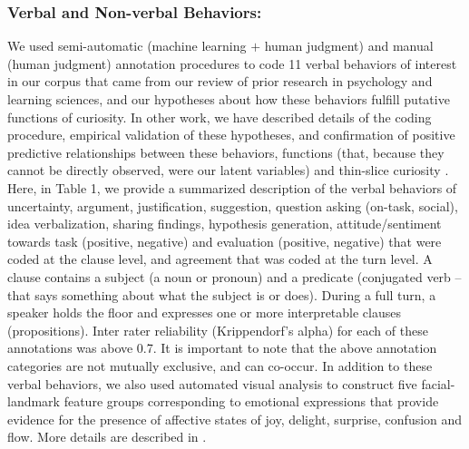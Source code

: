 \documentclass{llncs}
\begin{document}
\subsubsection{Verbal and Non-verbal Behaviors:}
\vspace{-0.35cm}
We used semi-automatic (machine learning $+$ human judgment) and manual (human judgment) annotation procedures to code 11 verbal behaviors of interest in our corpus that came from our review of prior research in psychology and learning sciences, and our hypotheses about how these behaviors fulfill putative functions of curiosity. In other work, we have described details of the coding procedure, empirical validation of these hypotheses, and confirmation of positive predictive relationships between these behaviors, functions (that, because they cannot be directly observed, were our latent variables) and thin-slice curiosity \cite{sinhaectel1}. Here, in Table 1, we provide a summarized description of the verbal behaviors of uncertainty, argument, justification, suggestion, question asking (on-task, social), idea verbalization, sharing findings, hypothesis generation, attitude/sentiment towards task (positive, negative) and evaluation (positive, negative) that were coded at the clause level, and agreement that was coded at the turn level. A clause contains a subject (a noun or pronoun) and a predicate (conjugated verb – that says something about what the subject is or does). During a full turn, a speaker holds the floor and expresses one or more interpretable clauses (propositions). Inter rater reliability (Krippendorf's alpha) for each of these annotations was above 0.7. It is important to note that the above
annotation categories are not mutually exclusive, and can co-occur. In addition
to these verbal behaviors, we also used automated visual analysis to construct
five facial-landmark feature groups corresponding to emotional expressions that
provide evidence for the presence of affective states of joy, delight, surprise,
confusion and 
flow. More details are described in \cite{sinhaectel1}.

\vspace{-0.5cm}
\end{document}
